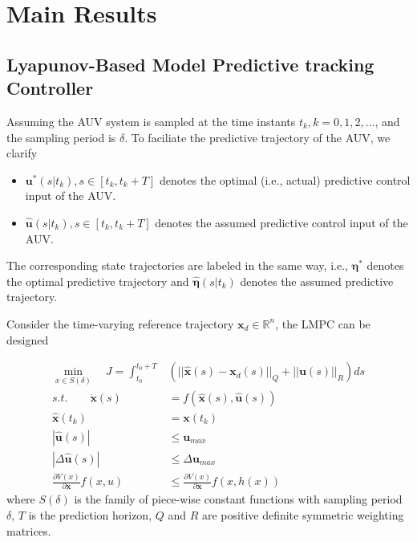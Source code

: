\documentclass[journal,11pt,draftcls,onecolumn]{IEEEtran}
\begin{document}
\section{Main Results}

\subsection{Lyapunov-Based Model Predictive tracking Controller}
Assuming the AUV system is sampled at the time instants $t_k,k=0,1,2,...$, and the sampling period is $\delta$. To faciliate the predictive trajectory of the AUV, we clarify
\begin{itemize}
\item $\textbf{u}^*(s|t_k),s\in[t_k,t_k+T]$ denotes the optimal (i.e., actual) predictive control input of the AUV.
\item $ \hat {\textbf{u}}(s|t_k),s\in[t_k,t_k+T]$ denotes the assumed predictive control input of the AUV.
\end{itemize}

The corresponding state trajectories are labeled in the same way, i.e., $\bm\eta^*$ denotes the optimal predictive trajectory and $\hat{\bm{\eta}}(s|t_k)$ denotes the assumed predictive trajectory.

Consider the time-varying reference trajectory $\textbf{x}_d\in \mathbb{R}^n $, the LMPC can be designed 

\begin{subequations} \label{eq:9}
\begin{align}
\min_{x\in S(\delta)}\quad J=\int_{t_0}^{t_0+T}&(||\hat{\textbf{{x}}}(s)-\textbf{x}_d(s)||_Q+||\textbf{u}(s)||_R)ds\label{eq:a}\\
s.t.\qquad \dot{\textbf{x}}(s)&= f(\hat {\textbf{x}}(s),\hat{\textbf{u}}(s))\label{eq:b}\\
\hat{\textbf{x}}(t_k)&=\textbf{x}(t_k)\label{eq:9c}\\
|\hat{\textbf{u}}(s)|&\leq \textbf{u}_{max}\label{eq:9d}\\
|\Delta\hat{\textbf{u}}(s)|&\leq\Delta \textbf{u}_{max}\label{eq:9e}\\
\frac{\partial V(x)}{\partial \textbf{x}}f(x,u)&\leq \frac{\partial V(x)}{\partial \textbf{x}}f(x,h(x))\label{eq:9f}
\end{align}
\end{subequations}
where $S(\delta)$ is the family of piece-wise constant functions with sampling period $\delta$, $T$ is the prediction horizon, $Q$ and $R$ are positive definite symmetric weighting matrices. 
\end{document}
